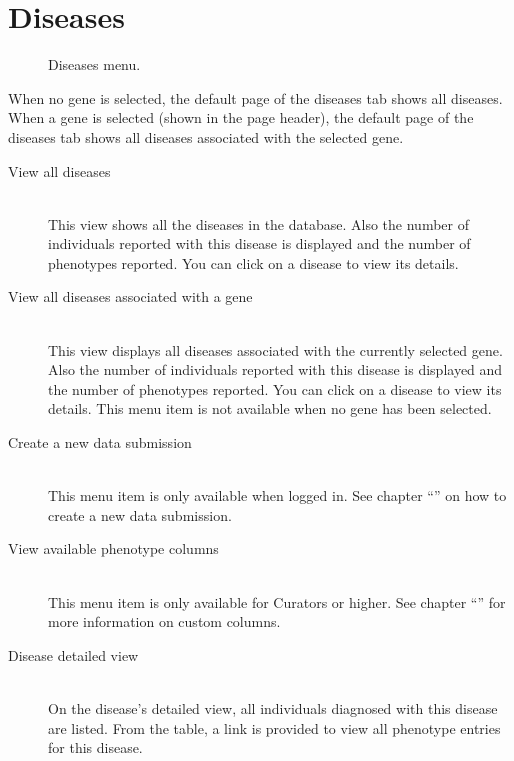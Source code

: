 \section{Diseases}
\begin{wrapfigure}[12]{r}{7cm}
  \vspace{-25pt}
  \begin{shaded}
    \centering
    \caption{Diseases menu.}
  \end{shaded}
\end{wrapfigure}
When no gene is selected, the default page of the diseases tab shows all diseases.
When a gene is selected (shown in the page header),
 the default page of the diseases tab shows all diseases associated with the selected gene.

\begin{description}
  \item [View all diseases] \hfill \\
  This view shows all the diseases in the database.
  Also the number of individuals reported with this disease is displayed and the number of phenotypes reported.
  You can click on a disease to view its details.
  \item [View all diseases associated with a gene] \hfill \\
  This view displays all diseases associated with the currently selected gene.
  Also the number of individuals reported with this disease is displayed and the number of phenotypes reported.
  You can click on a disease to view its details.
  This menu item is not available when no gene has been selected.
\end{description}

\begin{description}
  \item [Create a new data submission] \hfill \\
  This menu item is only available when logged in.
  See chapter ``'' on how to create a new data submission.
  \item [View available phenotype columns] \hfill \\
  This menu item is only available for Curators or higher.
  See chapter ``'' for more information on custom columns.
  \item [Disease detailed view] \hfill \\
  On the disease's detailed view, all individuals diagnosed with this disease are listed.
  From the table, a link is provided to view all phenotype entries for this disease.
\end{description}





